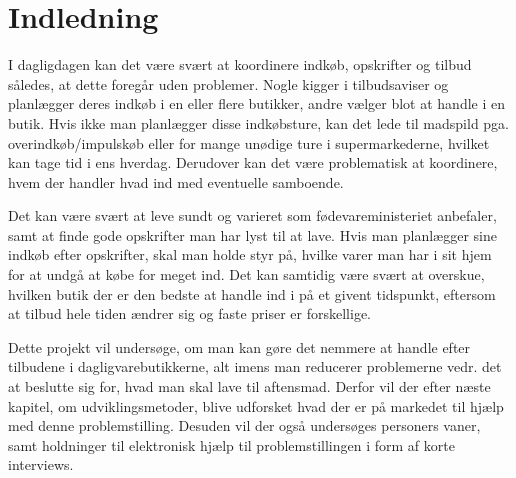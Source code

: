 \chapter{Indledning}\label{chapter:indledning}

I dagligdagen kan det være svært at koordinere indkøb, opskrifter og tilbud således, at dette foregår uden problemer. Nogle kigger i tilbudsaviser og planlægger deres indkøb i en eller flere butikker, andre vælger blot at handle i en butik.
Hvis ikke man planlægger disse indkøbsture, kan det lede til madspild pga. overindkøb/impulskøb eller for mange unødige ture i supermarkederne, hvilket kan tage tid i ens hverdag. Derudover kan det være problematisk at koordinere, hvem der handler hvad ind med eventuelle samboende.

Det kan være svært at leve sundt og varieret som fødevareministeriet anbefaler, samt  at finde gode opskrifter man har lyst til at lave.
Hvis man planlægger sine indkøb efter opskrifter, skal man holde styr på, hvilke varer man har i sit hjem for at undgå at købe for meget ind. Det kan samtidig være svært at overskue, hvilken butik der er den bedste at handle ind i på et givent tidspunkt, eftersom at tilbud hele tiden ændrer sig og faste priser er forskellige. 

Dette projekt vil undersøge, om man kan gøre det nemmere at handle efter tilbudene i dagligvarebutikkerne, alt imens man reducerer problemerne vedr. det at beslutte sig for, hvad man skal lave til aftensmad.
Derfor vil der efter næste kapitel, om udviklingsmetoder, blive udforsket hvad der er på markedet til hjælp med denne problemstilling.
Desuden vil der også undersøges personers vaner, samt holdninger til elektronisk hjælp til problemstillingen i form af korte interviews.
